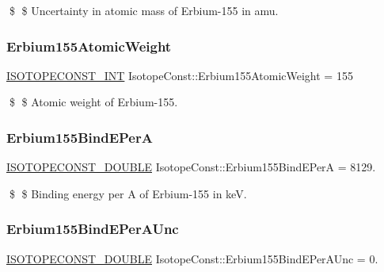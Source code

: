 \$ \$ Uncertainty in atomic mass of Erbium-\/155 in amu. \mbox{\label{group___isotope_const-_erbium-_er155_ga1bd08507670691a8c7cde7726391ad7e}} 
\subsubsection{\texorpdfstring{Erbium155\+Atomic\+Weight}{Erbium155AtomicWeight}}
{\footnotesize\ttfamily \mbox{\hyperlink{group___isotope_const-_macros_ga5f18360b3e99483a35c32d789e62621c}{I\+S\+O\+T\+O\+P\+E\+C\+O\+N\+S\+T\+\_\+\+I\+NT}} Isotope\+Const\+::\+Erbium155\+Atomic\+Weight = 155}

\$ \$ Atomic weight of Erbium-\/155. \mbox{\label{group___isotope_const-_erbium-_er155_gad62c4c08612c8c2c17e265d97303d7b0}} 
\subsubsection{\texorpdfstring{Erbium155\+Bind\+E\+PerA}{Erbium155BindEPerA}}
{\footnotesize\ttfamily \mbox{\hyperlink{group___isotope_const-_macros_ga8f45a7272ce02c0b4c65c44636ed719a}{I\+S\+O\+T\+O\+P\+E\+C\+O\+N\+S\+T\+\_\+\+D\+O\+U\+B\+LE}} Isotope\+Const\+::\+Erbium155\+Bind\+E\+PerA = 8129.}

\$ \$ Binding energy per A of Erbium-\/155 in keV. \mbox{\label{group___isotope_const-_erbium-_er155_ga5158e73fa3022e17e4feb77b36f7816d}} 
\subsubsection{\texorpdfstring{Erbium155\+Bind\+E\+Per\+A\+Unc}{Erbium155BindEPerAUnc}}
{\footnotesize\ttfamily \mbox{\hyperlink{group___isotope_const-_macros_ga8f45a7272ce02c0b4c65c44636ed719a}{I\+S\+O\+T\+O\+P\+E\+C\+O\+N\+S\+T\+\_\+\+D\+O\+U\+B\+LE}} Isotope\+Const\+::\+Erbium155\+Bind\+E\+Per\+A\+Unc = 0.}

